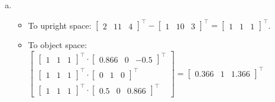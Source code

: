 \documentclass[11pt]{article}
\begin{document}
\begin{enumerate}[a.]
	\item %
	\begin{itemize}
		\item To upright space: $\begin{bmatrix}
				2 & 11 & 4
			\end{bmatrix}^\intercal
			- \begin{bmatrix}
				1 & 10 & 3
			\end{bmatrix}^\intercal
			= \begin{bmatrix}
				1 & 1 & 1
			\end{bmatrix}^\intercal$.
		\item To object space: $\begin{bmatrix}
				\begin{bmatrix}
					1 & 1 & 1
				\end{bmatrix}^\intercal \cdot
				\begin{bmatrix}
					0.866 & 0 & -0.5
				\end{bmatrix}^\intercal \\
				\begin{bmatrix}
					1 & 1 & 1
				\end{bmatrix}^\intercal \cdot
				\begin{bmatrix}
					0 & 1 & 0
				\end{bmatrix}^\intercal \\
				\begin{bmatrix}
					1 & 1 & 1
				\end{bmatrix}^\intercal \cdot
				\begin{bmatrix}
					0.5 & 0 & 0.866
				\end{bmatrix}^\intercal
			\end{bmatrix}=
			\begin{bmatrix}
				0.366 & 1 & 1.366
			\end{bmatrix}^\intercal
			$
	\end{itemize}
	

\end{enumerate}
\end{document}
